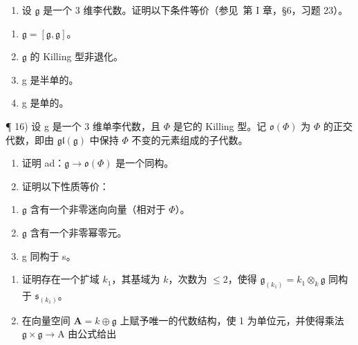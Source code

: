 
\begin{enumerate}
\def\labelenumi{\arabic{enumi})}
\setcounter{enumi}{14}
\tightlist
\item
  设 \(\mathfrak{g}\) 是一个 3 维李代数。证明以下条件等价（参见~第 I 章，§6，习题 23）。
\end{enumerate}

\begin{enumerate}
\def\labelenumi{(\roman{enumi})}
\item
  \(\mathfrak{g} = [\mathfrak{g},\mathfrak{g}]\)。
\item
  \(\mathfrak{g}\) 的 Killing 型非退化。
\item
  g 是半单的。
\item
  g 是单的。
\end{enumerate}

¶ 16) 设 g 是一个 3 维单李代数，且 \(\Phi\) 是它的 Killing 型。记 \(\mathfrak{o}(\Phi)\) 为 \(\Phi\) 的正交代数，即由 \(\mathfrak{gl}(\mathfrak{g})\) 中保持 \(\Phi\) 不变的元素组成的子代数。

\begin{enumerate}
\def\labelenumi{\alph{enumi})}
\item
  证明 ad：\(\mathfrak{g} \to \mathfrak{o}(\varPhi)\) 是一个同构。
\item
  证明以下性质等价：
\end{enumerate}

\begin{enumerate}
\def\labelenumi{(\roman{enumi})}
\item
  \(\mathfrak{g}\) 含有一个非零迷向向量（相对于 \(\varPhi\)）。
\item
  \(\mathfrak{g}\) 含有一个非零幂零元。
\item
  g 同构于 s。
\end{enumerate}

\begin{enumerate}
\def\labelenumi{\alph{enumi})}
\setcounter{enumi}{2}
\item
  证明存在一个扩域 \(k_{1}\)，其基域为 \(k\)，次数为 \(\leq 2\)，使得 \(\mathfrak{g}_{(k_1)} = k_1 \otimes_k \mathfrak{g}\) 同构于 \(\mathfrak{s}_{(k_1)}\)。
\item
  在向量空间 \(\mathbf{A} = k\oplus \mathfrak{g}\) 上赋予唯一的代数结构，使 1 为单位元，并使得乘法 \(\mathfrak{g}\times \mathfrak{g}\to \mathrm{A}\) 由公式给出
\end{enumerate}

